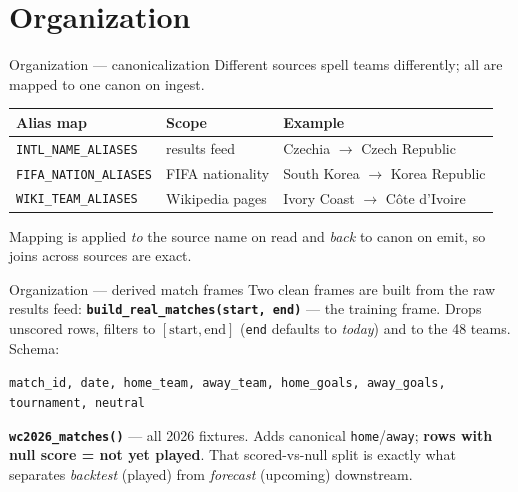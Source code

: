 \documentclass[aspectratio=169]{beamer}
\begin{document}
\section{Organization}

\begin{frame}{Organization --- canonicalization}
Different sources spell teams differently; all are mapped to one canon on ingest.
\centering
\begin{tabular}{@{}lll@{}}
\toprule
Alias map & Scope & Example \\
\midrule
\texttt{INTL\_NAME\_ALIASES}  & results feed & Czechia $\to$ Czech Republic \\
\texttt{FIFA\_NATION\_ALIASES}& FIFA nationality & South Korea $\to$ Korea Republic \\
\texttt{WIKI\_TEAM\_ALIASES}  & Wikipedia pages & Ivory Coast $\to$ C\^ote d'Ivoire \\
\bottomrule
\end{tabular}
\vspace{1em}
\footnotesize Mapping is applied \emph{to} the source name on read and
\emph{back} to canon on emit, so joins across sources are exact.
\end{frame}

\begin{frame}{Organization --- derived match frames}
Two clean frames are built from the raw results feed:
\vspace{0.5em}
\textbf{\texttt{build\_real\_matches(start, end)}} --- the training frame.
Drops unscored rows, filters to $[\text{start}, \text{end}]$ (\texttt{end}
defaults to \emph{today}) and to the 48 teams. Schema:
\begin{center}\scriptsize
\texttt{match\_id, date, home\_team, away\_team, home\_goals, away\_goals,
tournament, neutral}
\end{center}
\textbf{\texttt{wc2026\_matches()}} --- all 2026 fixtures. Adds canonical
\texttt{home}/\texttt{away}; \textbf{rows with null score = not yet played}.
\vspace{0.5em}
\footnotesize That scored-vs-null split is exactly what separates
\emph{backtest} (played) from \emph{forecast} (upcoming) downstream.
\end{frame}
\end{document}
